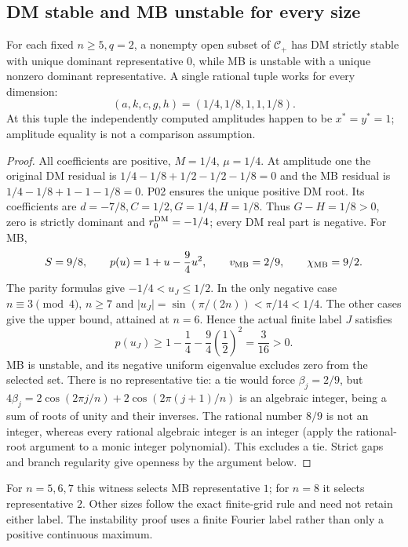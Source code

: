 \subsection{DM stable and MB unstable for every size}
\begin{theorem}
\label{thm:P08-forward}
For each fixed $n\ge5,q=2$, a nonempty open subset of $\mathcal C_+$
has DM strictly stable with unique dominant representative $0$, while
MB is unstable with a unique nonzero dominant representative. A single
rational tuple works for every dimension:
\begin{equation}
 \boxed{(a,k,c,g,h)=(1/4,1/8,1,1,1/8).}
 \label{eq:P08-forward-witness}
\end{equation}
At this tuple the independently computed amplitudes happen to be
$x^*=y^*=1$; amplitude equality is not a comparison assumption.
\end{theorem}
\begin{proof}
All coefficients are positive, $M=1/4$, $\mu=1/4$. At amplitude one
the original DM residual is $1/4-1/8+1/2-1/2-1/8=0$ and the MB
residual is $1/4-1/8+1-1-1/8=0$. P02 ensures the unique positive DM
root. Its coefficients are $d=-7/8,C=1/2,G=1/4,H=1/8$.
Thus $G-H=1/8>0$, zero is strictly dominant and
$r_0^{\mathrm{DM}}=-1/4$; every DM real part is negative.
For MB,
\[
 S=9/8,\qquad p(u)=1+u-\frac94u^2,\qquad
 v_{\mathrm{MB}}=2/9,\qquad\chi_{\mathrm{MB}}=9/2.
\]
The parity formulas give $-1/4<u_J\le1/2$.
In the only negative case $n\equiv3\pmod4$, $n\ge7$ and
$|u_J|=\sin(\pi/(2n))<\pi/14<1/4$. The other cases give the
upper bound, attained at $n=6$. Hence the actual finite label $J$ satisfies
\[
 p(u_J)\ge1-\frac14-\frac94\left(\frac12\right)^2
 =\frac3{16}>0.
\]
MB is unstable, and its negative uniform eigenvalue excludes zero from
the selected set. There is no representative tie: a tie would force
$\beta_j=2/9$, but
$4\beta_j=2\cos(2\pi j/n)+2\cos(2\pi(j+1)/n)$ is an algebraic
integer, being a sum of roots of unity and their inverses. The rational
number $8/9$ is not an integer, whereas every rational algebraic integer
is an integer (apply the rational-root argument to a monic integer
polynomial). This excludes a tie. Strict gaps and branch regularity
give openness by the argument below.
\end{proof}
For $n=5,6,7$ this witness selects MB representative $1$; for $n=8$
it selects representative $2$. Other sizes follow the exact finite-grid
rule and need not retain either label.
The instability proof uses a finite Fourier label rather than only a
positive continuous maximum.

